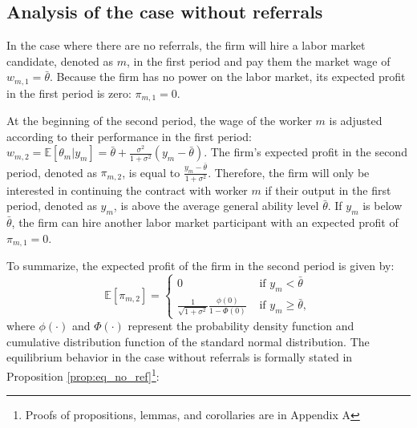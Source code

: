 \documentclass[12pt]{article}
\begin{document}
\subsection{Analysis of the case without referrals}

In the case where there are no referrals, the firm will hire a labor market candidate, denoted as $m$, in the first period and pay them the market wage of $w_{m,1} = \bar{\theta}$. Because the firm has no power on the labor market, its expected profit in the first period is zero: $\pi_{m,1} = 0$.

At the beginning of the second period, the wage of the worker $m$ is adjusted according to their performance in the first period: $w_{m,2} = \mathbb{E}[\theta_m|y_m] = \bar{\theta} + \frac{\sigma^2}{1+\sigma^2}(y_m-\bar{\theta})$. The firm's expected profit in the second period, denoted as $\pi_{m,2}$, is equal to $\frac{y_m-\bar{\theta}}{1+\sigma^2}$. Therefore, the firm will only be interested in continuing the contract with worker $m$ if their output in the first period, denoted as $y_m$, is above the average general ability level $\bar{\theta}$. If $y_m$ is below $\bar{\theta}$, the firm can hire another labor market participant with an expected profit of $\pi_{m,1}=0$.

To summarize, the expected profit of the firm in the second period is given by:
\begin{equation}
    \mathbb{E}[\pi_{m,2}]= 
    \begin{cases}
        0 & \text{ if } y_m < \bar{\theta}\\
        \frac{1}{\sqrt{1 + \sigma^2}}\frac{\phi(0)}{1-\Phi(0)} & \text{ if } y_m \geq \bar{\theta},
    \end{cases}
\end{equation}
where $\phi(\cdot)$ and $\Phi(\cdot)$ represent the probability density function and cumulative distribution function of the standard normal distribution. The equilibrium behavior in the case without referrals is formally stated in Proposition \ref{prop:eq_no_ref}\footnote{Proofs of propositions, lemmas, and corollaries are in Appendix A}:
\end{document}
